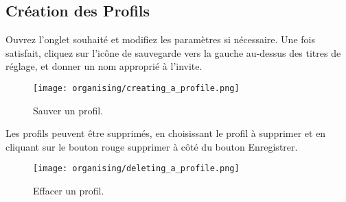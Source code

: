 \subsection{Création des Profils} %
\label{sub:creating_profiles}

Ouvrez l'onglet souhaité et modifiez les paramètres si nécessaire. Une fois satisfait, cliquez sur l'icône de sauvegarde vers la gauche au-dessus des titres de réglage, et donner un nom approprié à l'invite.

\begin{figure}[H]
\centering
\texttt{[image: organising/creating\_a\_profile.png]}
\caption{Sauver un profil.}
\label{fig:creating_a_profile}
\end{figure}

Les profils peuvent être supprimés, en choisissant le profil à supprimer et en cliquant sur le bouton rouge supprimer à côté du bouton Enregistrer.

\begin{figure}[H]
\centering
\texttt{[image: organising/deleting\_a\_profile.png]}
\caption{Effacer un profil.}
\label{fig:deleting_a_profile}
\end{figure}



